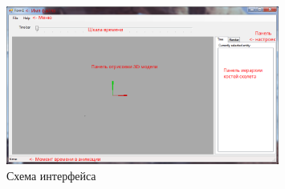 \begin{figure}[h!]
    \centering
    \includegraphics[width=0.8\textwidth]{../screenshots/main_empty.png}
    \caption{Схема интерфейса}
\end{figure}
